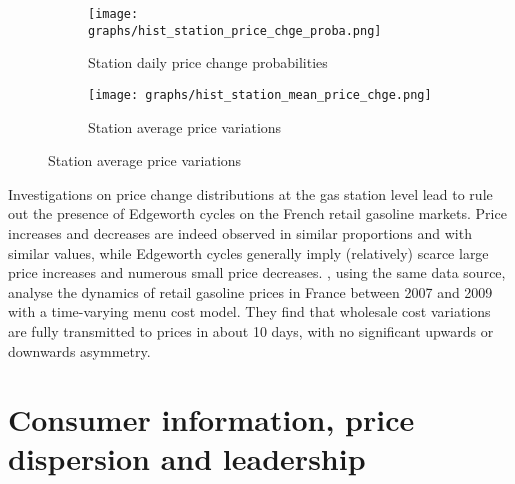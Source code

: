 \documentclass[english]{article}
\begin{document}
\begin{figure}[htb!]
\centering
\caption{Histograms of station price changes}
\begin{subfigure}{.49\textwidth}
\centering
\texttt{[image: graphs/hist\_station\_price\_chge\_proba.png]}
\caption[short]{Station daily price change probabilities}
\label{fig:hist_station_price_chge_proba}
\end{subfigure}
\begin{subfigure}{.49\textwidth}
\centering
\texttt{[image: graphs/hist\_station\_mean\_price\_chge.png]}
\caption[short]{Station average price variations}
\label{fig:hist_station_mean_price_chge}
\end{subfigure}
\end{figure}

Investigations on price change distributions at the gas station level lead to rule out the presence of Edgeworth cycles on the French retail gasoline markets. Price increases and decreases are indeed observed in similar proportions and with similar values, while Edgeworth cycles generally imply (relatively) scarce large price increases and numerous small price decreases. \cite{GAU15}, using the same data source, analyse the dynamics of retail gasoline prices in France between 2007 and 2009 with a time-varying menu cost model. They find that wholesale cost variations are fully transmitted to prices in about 10 days, with no significant upwards or downwards asymmetry.

\section{Consumer information, price dispersion and leadership}
\end{document}
